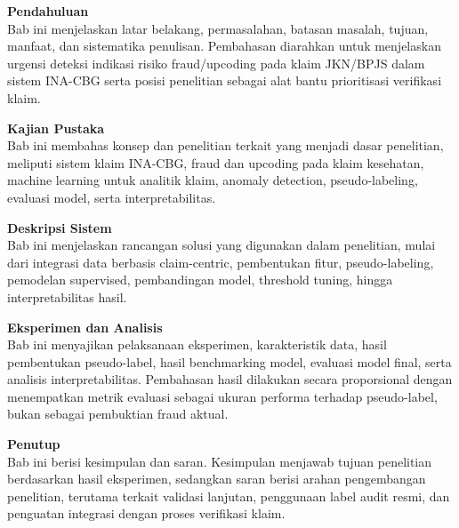 \begin{description}[leftmargin=2.2cm, labelsep=0cm, itemsep=0.1cm]
  \item[{\makebox[2.2cm][l]{\textbf{Bab 1}}}] \textbf{Pendahuluan}\\
  Bab ini menjelaskan latar belakang, permasalahan, batasan masalah, tujuan, manfaat, dan sistematika penulisan. Pembahasan diarahkan untuk menjelaskan urgensi deteksi indikasi risiko fraud/upcoding pada klaim JKN/BPJS dalam sistem INA-CBG serta posisi penelitian sebagai alat bantu prioritisasi verifikasi klaim.

  \item[{\makebox[2.2cm][l]{\textbf{Bab 2}}}] \textbf{Kajian Pustaka}\\
  Bab ini membahas konsep dan penelitian terkait yang menjadi dasar penelitian, meliputi sistem klaim INA-CBG, fraud dan upcoding pada klaim kesehatan, machine learning untuk analitik klaim, anomaly detection, pseudo-labeling, evaluasi model, serta interpretabilitas.

  \item[{\makebox[2.2cm][l]{\textbf{Bab 3}}}] \textbf{Deskripsi Sistem}\\
  Bab ini menjelaskan rancangan solusi yang digunakan dalam penelitian, mulai dari integrasi data berbasis claim-centric, pembentukan fitur, pseudo-labeling, pemodelan supervised, pembandingan model, threshold tuning, hingga interpretabilitas hasil.

  \item[{\makebox[2.2cm][l]{\textbf{Bab 4}}}] \textbf{Eksperimen dan Analisis}\\
  Bab ini menyajikan pelaksanaan eksperimen, karakteristik data, hasil pembentukan pseudo-label, hasil benchmarking model, evaluasi model final, serta analisis interpretabilitas. Pembahasan hasil dilakukan secara proporsional dengan menempatkan metrik evaluasi sebagai ukuran performa terhadap pseudo-label, bukan sebagai pembuktian fraud aktual.

  \item[{\makebox[2.2cm][l]{\textbf{Bab 5}}}] \textbf{Penutup}\\
  Bab ini berisi kesimpulan dan saran. Kesimpulan menjawab tujuan penelitian berdasarkan hasil eksperimen, sedangkan saran berisi arahan pengembangan penelitian, terutama terkait validasi lanjutan, penggunaan label audit resmi, dan penguatan integrasi dengan proses verifikasi klaim.
\end{description}
